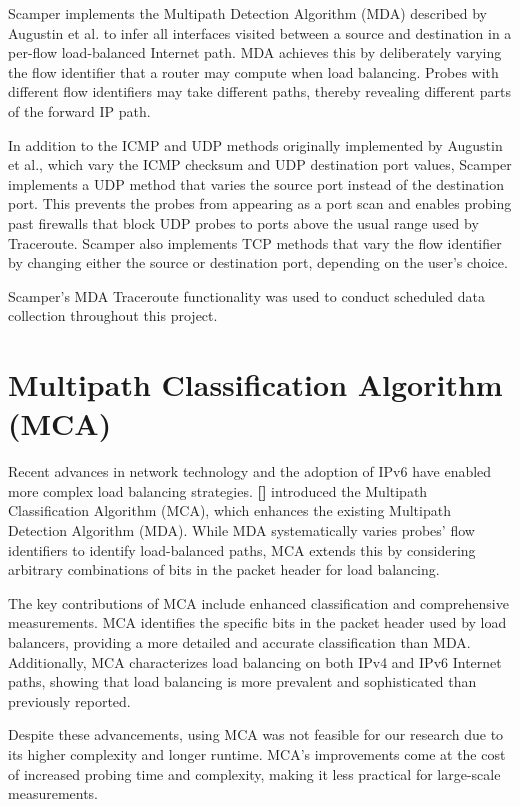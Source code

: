 \documentclass[12pt]{cwru_thesis}
\begin{document}
Scamper implements the Multipath Detection Algorithm (MDA) described by Augustin et al. to infer all interfaces visited between a source and destination in a per-flow load-balanced Internet path. MDA achieves this by deliberately varying the flow identifier that a router may compute when load balancing. Probes with different flow identifiers may take different paths, thereby revealing different parts of the forward IP path.

In addition to the ICMP and UDP methods originally implemented by Augustin et al., which vary the ICMP checksum and UDP destination port values, Scamper implements a UDP method that varies the source port instead of the destination port. This prevents the probes from appearing as a port scan and enables probing past firewalls that block UDP probes to ports above the usual range used by Traceroute. Scamper also implements TCP methods that vary the flow identifier by changing either the source or destination port, depending on the user’s choice.

Scamper's MDA Traceroute functionality was used to conduct scheduled data collection throughout this project.

\section{Multipath Classification Algorithm (MCA)}

Recent advances in network technology and the adoption of IPv6 have enabled more complex load balancing strategies. \textbf{[\cite{9155387}]} introduced the Multipath Classification Algorithm (MCA), which enhances the existing Multipath Detection Algorithm (MDA). While MDA systematically varies probes' flow identifiers to identify load-balanced paths, MCA extends this by considering arbitrary combinations of bits in the packet header for load balancing.

The key contributions of MCA include enhanced classification and comprehensive measurements. MCA identifies the specific bits in the packet header used by load balancers, providing a more detailed and accurate classification than MDA. Additionally, MCA characterizes load balancing on both IPv4 and IPv6 Internet paths, showing that load balancing is more prevalent and sophisticated than previously reported.


Despite these advancements, using MCA was not feasible for our research due to its higher complexity and longer runtime. MCA's improvements come at the cost of increased probing time and complexity, making it less practical for large-scale measurements.\\
\end{document}
